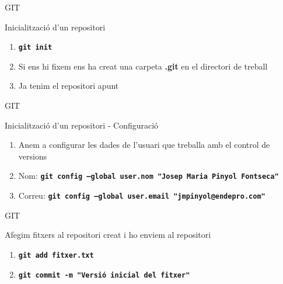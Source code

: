 \documentclass[10pt,xcolor={rgb}]{beamer}
\begin{document}
    \begin{frame}[fragile]{GIT}
      \begin{block}{Inicialització d'un repositori}

        \begin{enumerate}
          \item \texttt{\textbf{git init}}
          \item Si ens hi fixem ens ha creat una carpeta \textbf{.git} en el directori de treball
          \item Ja tenim el repositori apunt

        \end{enumerate}

      \end{block}
    \end{frame}

    \begin{frame}[fragile]{GIT}
      \begin{block}{Inicialització d'un repositori - Configuració}

        \begin{enumerate}
          \item Anem a configurar les dades de l'usuari que treballa amb el control de versions
          \item Nom: \texttt{\textbf{git config --global user.nom "Josep Maria Pinyol Fontseca" }}
          \item Correu: \texttt{\textbf{git config --global user.email "jmpinyol@endepro.com" }}

        \end{enumerate}

      \end{block}
    \end{frame}

    \begin{frame}[fragile]{GIT}
      \begin{block}{Afegim fitxers al repositori creat i ho enviem al repositori}

        \begin{enumerate}
          \item \texttt{\textbf{git add fitxer.txt}}
          \item \texttt{\textbf{git commit -m "Versió inicial del fitxer"}}
        \end{enumerate}

      \end{block}
    \end{frame}
\end{document}
